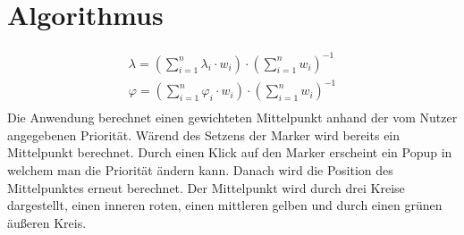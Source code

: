\documentclass[a4paper, twoside, 12pt]{scrreprt}
\begin{document}
\chapter{Algorithmus}
\begin{eqnarray}
\displaystyle
\lambda = \left(\sum_{i=1}^{n}\lambda_i \cdot w_i \right) \cdot \left(\sum_{i=1}^{n} w_i \right)^{-1}\\
\varphi = \left(\sum_{i=1}^{n}\varphi_i \cdot w_i \right) \cdot \left(\sum_{i=1}^{n} w_i \right)^{-1}\\
\end{eqnarray}
Die Anwendung berechnet einen gewichteten Mittelpunkt anhand der vom Nutzer angegebenen Priorität.
Wärend des Setzens der Marker wird bereits ein Mittelpunkt berechnet.
Durch einen Klick auf den Marker erscheint ein Popup in welchem man die Priorität ändern kann. 
Danach wird die Position des Mittelpunktes erneut berechnet.
Der Mittelpunkt wird durch drei Kreise dargestellt, einen inneren roten, einen mittleren gelben und durch einen grünen äußeren Kreis.
\end{document}
